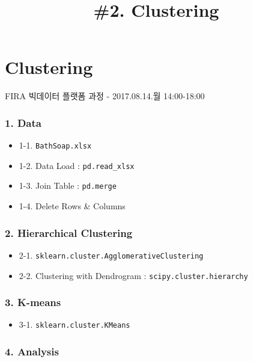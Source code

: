 \documentclass[11pt]{article}
\title{\#2. Clustering}
\providecommand{\tightlist}{%
      \setlength{\itemsep}{0pt}\setlength{\parskip}{0pt}}
\begin{document}
    
    
    \maketitle
    
    

    
    \section{Clustering}\label{clustering}

FIRA 빅데이터 플랫폼 과정 - 2017.08.14.월 14:00-18:00

    \subsubsection{1. Data}\label{data}

\begin{itemize}
\tightlist
\item
  1-1. \texttt{BathSoap.xlsx}
\item
  1-2. Data Load : \texttt{pd.read\_xlsx}
\item
  1-3. Join Table : \texttt{pd.merge}
\item
  1-4. Delete Rows \& Columns
\end{itemize}

\subsubsection{2. Hierarchical
Clustering}\label{hierarchical-clustering}

\begin{itemize}
\tightlist
\item
  2-1. \texttt{sklearn.cluster.AgglomerativeClustering}
\item
  2-2. Clustering with Dendrogram : \texttt{scipy.cluster.hierarchy}
\end{itemize}

\subsubsection{3. K-means}\label{k-means}

\begin{itemize}
\tightlist
\item
  3-1. \texttt{sklearn.cluster.KMeans}
\end{itemize}

\subsubsection{4. Analysis}\label{analysis}
\end{document}
